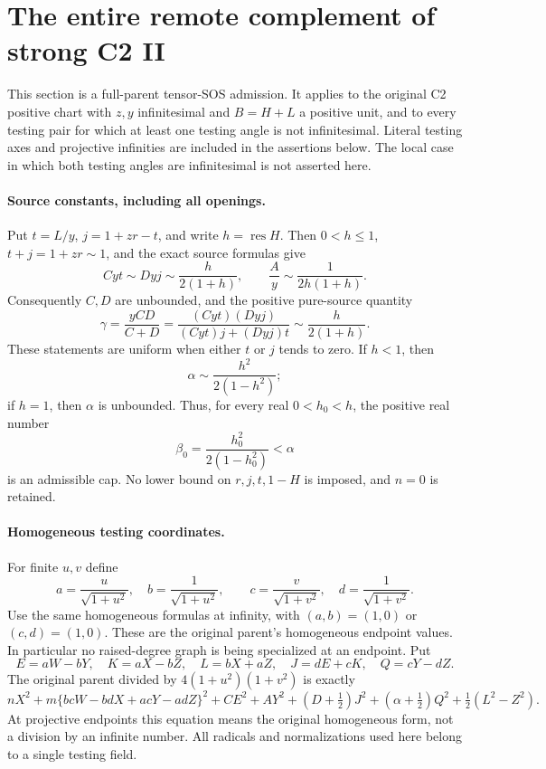 \section{The entire remote complement of strong C2 II}
\label{sec:r7-c2-remote}

This section is a full-parent tensor-SOS admission.  It applies to the
original C2 positive chart with $z,y$ infinitesimal and $B=H+L$ a
positive unit, and to every testing pair for which at least one testing
angle is not infinitesimal.  Literal testing axes and projective
infinities are included in the assertions below.  The local case in
which both testing angles are infinitesimal is not asserted here.

\paragraph{Source constants, including all openings.}
Put $t=L/y$, $j=1+zr-t$, and write $h=\operatorname{res}H$.
Then $0<h\leq1$, $t+j=1+zr\sim1$, and the exact source formulas give
\[
 Cyt\sim Dyj\sim\frac{h}{2(1+h)},\qquad
 \frac Ay\sim\frac1{2h(1+h)}.
\]
Consequently $C,D$ are unbounded, and the positive pure-source quantity
\[
 \gamma=\frac{yCD}{C+D}
 =\frac{(Cyt)(Dyj)}{(Cyt)j+(Dyj)t}
 \sim\frac{h}{2(1+h)}.                                      \tag{RR1}
\]
These statements are uniform when either $t$ or $j$ tends to zero.
If $h<1$, then
\[
 \alpha\sim\frac{h^2}{2(1-h^2)};
\]
if $h=1$, then $\alpha$ is unbounded.  Thus, for every real
$0<h_0<h$, the positive real number
\[
 \beta_0=\frac{h_0^2}{2(1-h_0^2)}<\alpha                     \tag{RR2}
\]
is an admissible cap.  No lower bound on $r,j,t,1-H$ is imposed,
and $n=0$ is retained.

\paragraph{Homogeneous testing coordinates.}
For finite $u,v$ define
\[
 a=\frac{u}{\sqrt{1+u^2}},\quad b=\frac1{\sqrt{1+u^2}},\qquad
 c=\frac{v}{\sqrt{1+v^2}},\quad d=\frac1{\sqrt{1+v^2}}.
\]
Use the same homogeneous formulas at infinity, with $(a,b)=(1,0)$
or $(c,d)=(1,0)$.  These are the original parent's homogeneous
endpoint values.  In particular no raised-degree graph is being
specialized at an endpoint.  Put
\[
 E=aW-bY,\quad K=aX-bZ,\quad L=bX+aZ,
 \quad J=dE+cK,\quad Q=cY-dZ.
\]
The original parent divided by $4(1+u^2)(1+v^2)$ is exactly
\[
 nX^2+m\{bcW-bdX+acY-adZ\}^2+CE^2+AY^2
 +(D+\tfrac12)J^2+(\alpha+\tfrac12)Q^2
 +\tfrac12(L^2-Z^2).                                    \tag{RR3}
\]
At projective endpoints this equation means the original homogeneous
form, not a division by an infinite number.  All radicals and
normalizations used here belong to a single testing field.

